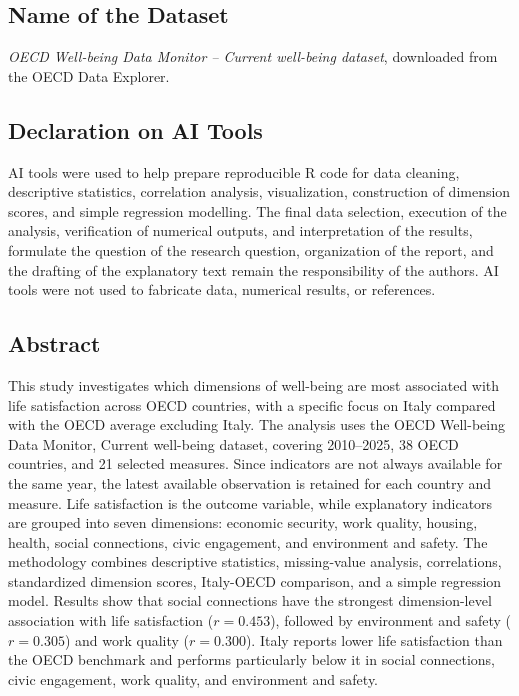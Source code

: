 \documentclass[11pt,a4paper]{article}
\begin{document}
\subsection*{Name of the Dataset}
\textit{OECD Well-being Data Monitor -- Current well-being dataset}, downloaded from the OECD Data Explorer.

\subsection*{Declaration on AI Tools}
AI tools were used to help prepare reproducible R code for data cleaning, descriptive statistics, correlation analysis, visualization, construction of dimension scores, and simple regression modelling. The final data selection, execution of the analysis, verification of numerical outputs, and interpretation of the results, formulate the question of the research question, organization of the report, and the drafting of the explanatory text remain the responsibility of the authors. AI tools were not used to fabricate data, numerical results, or references.

\subsection*{Abstract}
\begin{bluebox}
This study investigates which dimensions of well-being are most associated with life satisfaction across OECD countries, with a specific focus on Italy compared with the OECD average excluding Italy. The analysis uses the OECD Well-being Data Monitor, Current well-being dataset, covering 2010--2025, 38 OECD countries, and 21 selected measures. Since indicators are not always available for the same year, the latest available observation is retained for each country and measure. Life satisfaction is the outcome variable, while explanatory indicators are grouped into seven dimensions: economic security, work quality, housing, health, social connections, civic engagement, and environment and safety. The methodology combines descriptive statistics, missing-value analysis, correlations, standardized dimension scores, Italy-OECD comparison, and a simple regression model. Results show that social connections have the strongest dimension-level association with life satisfaction ($r=0.453$), followed by environment and safety ($r=0.305$) and work quality ($r=0.300$). Italy reports lower life satisfaction than the OECD benchmark and performs particularly below it in social connections, civic engagement, work quality, and environment and safety.
\end{bluebox}
\end{document}
